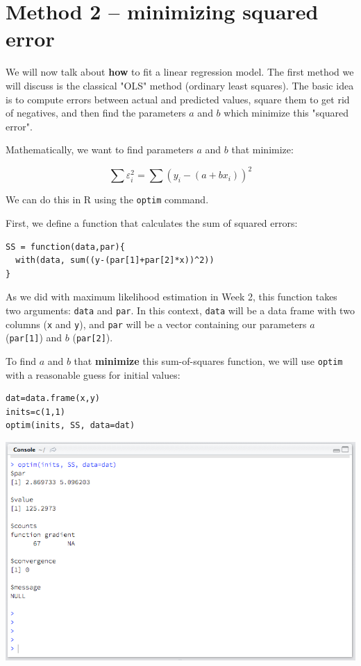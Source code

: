 \documentclass[11pt]{article}
\begin{document}
\section*{Method 2 -- minimizing squared error}
\label{sec-5}

We will now talk about \textbf{how} to fit a linear regression model.  The first method we will discuss is the classical "OLS" method (ordinary least squares).  The basic idea is to compute errors between actual and predicted values, square them to get rid of negatives, and then find the parameters $a$ and $b$ which minimize this "squared error".

Mathematically, we want to find parameters $a$ and $b$ that minimize:

\[
\sum \varepsilon_i^2 = \sum (y_i - (a+bx_i))^2
\]

We can do this in R using the \texttt{optim} command.

First, we define a function that calculates the sum of squared errors:

\begin{verbatim}
SS = function(data,par){
  with(data, sum((y-(par[1]+par[2]*x))^2))
}
\end{verbatim}

As we did with maximum likelihood estimation in Week 2, this function takes two arguments: \texttt{data} and \texttt{par}.  In this context, \texttt{data} will be a data frame with two columns (\texttt{x} and \texttt{y}), and \texttt{par} will be a vector containing our parameters $a$ (\texttt{par[1]}) and $b$ (\texttt{par[2]}).

To find $a$ and $b$ that \textbf{minimize} this sum-of-squares function, we will use \texttt{optim} with a reasonable guess for initial values:

\begin{verbatim}
dat=data.frame(x,y)
inits=c(1,1)
optim(inits, SS, data=dat)
\end{verbatim}

\includegraphics[width=.9\linewidth]{figures/week7/SS.png}
\end{document}
